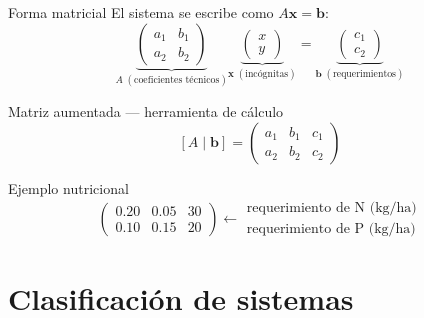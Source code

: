 \documentclass[11pt, aspectratio=169]{beamer}
\begin{document}
	\begin{frame}{Forma matricial}
		El sistema se escribe como $A\mathbf{x} = \mathbf{b}$:
		\[
		\underbrace{\begin{pmatrix} a_1 & b_1 \\ a_2 & b_2 \end{pmatrix}}_{A\;(\text{coeficientes técnicos})}
		\underbrace{\begin{pmatrix} x \\ y \end{pmatrix}}_{\mathbf{x}\;(\text{incógnitas})}
		=
		\underbrace{\begin{pmatrix} c_1 \\ c_2 \end{pmatrix}}_{\mathbf{b}\;(\text{requerimientos})}
		\]
		
		\vspace{0.3em}
		\begin{block}{Matriz aumentada — herramienta de cálculo}
			\[
			[A \mid \mathbf{b}] =
			\left(\begin{array}{cc|c}
				a_1 & b_1 & c_1 \\
				a_2 & b_2 & c_2
			\end{array}\right)
			\]
		\end{block}
		
		\vspace{0.2em}
		\begin{exampleblock}{Ejemplo nutricional}
			\[
			\left(\begin{array}{cc|c}
				0.20 & 0.05 & 30 \\
				0.10 & 0.15 & 20
			\end{array}\right)
			\leftarrow
			\begin{array}{l}
				\text{requerimiento de N (kg/ha)}\\
				\text{requerimiento de P (kg/ha)}
			\end{array}
			\]
		\end{exampleblock}
	\end{frame}
	
	\section{Clasificación de sistemas}
	
\end{document}
